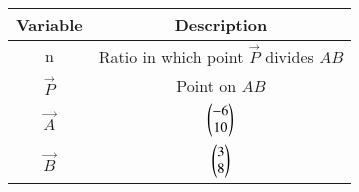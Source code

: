 \begin{tabular}[12pt]{ |c| c|}
    \hline
    \textbf{Variable} & \textbf{Description}\\ 
    \hline
    n & Ratio in which point $\vec{P}$ divides $AB$ \\
    \hline 
    $\vec{P}$ & Point on $AB$\\
    \hline
    $\vec{A}$ & $\begin{pmatrix}-6 \\ 10\end{pmatrix}$\\
    \hline
    $\vec{B}$ & $\begin{pmatrix}3 \\ 8\end{pmatrix}$\\
    \hline   
    \end{tabular}
